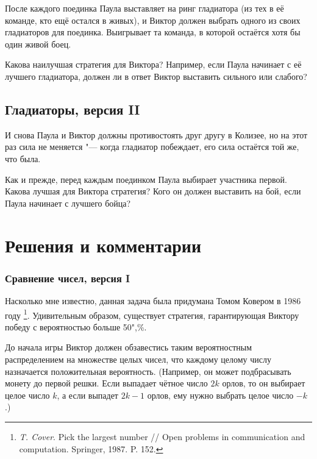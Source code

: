 \documentclass[twoside]{book}
\makeatletter
\newcommand{\rindex}[2][\imki@jobname]{%
\index[#1]{\detokenize{#2}}%
}
\makeatother
\begin{document}
После каждого поединка Паула выставляет на ринг гладиатора (из тех в её команде, кто ещё остался в живых), и Виктор должен выбрать одного из своих гладиаторов для поединка.
Выигрывает та команда, в которой остаётся хотя бы один живой боец.


Какова наилучшая стратегия для Виктора?
Например, если Паула начинает с её лучшего гладиатора, должен ли в ответ Виктор выставить сильного или слабого?


\subsection*{Гладиаторы, версия II} %
\rindex{Гладиаторы, версия II}

И снова Паула и Виктор должны противостоять друг другу в Колизее, но на этот раз сила не меняется "--- когда гладиатор побеждает, его сила остаётся той же, что была.


Как и прежде, перед каждым поединком Паула выбирает участника первой.
Какова лучшая для Виктора стратегия? Кого он должен выставить на бой, если Паула начинает с лучшего бойца?


\section*{Решения и комментарии}

\subsubsection*{Сравнение чисел, версия I}%

Насколько мне известно, данная задача была придумана Томом Ковером %
в 1986 году%
\footnote{\emph{T. Cover}. Pick the largest number /\!/ {Open problems in communication and computation.} Springer, 1987. P. 152.}.
Удивительным образом, существует стратегия, гарантирующая Виктору победу с вероятностью больше 50",\%.

\medskip

До начала игры Виктор должен обзавестись таким вероятностным распределением на множестве целых чисел, что каждому целому числу назначается положительная вероятность.
(Например, он может подбрасывать монету до первой решки.
Если выпадает чётное число $2k$ орлов, то он выбирает целое число $k$, а если выпадет $2k-1$ орлов, ему нужно выбрать целое число $-k$.)
\end{document}
